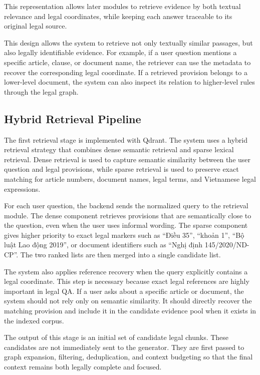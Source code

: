 This representation allows later modules to retrieve evidence by both textual relevance and legal coordinates, while keeping each answer traceable to its original legal source.

This design allows the system to retrieve not only textually similar passages, but also legally identifiable evidence. For example, if a user question mentions a specific article, clause, or document name, the retriever can use the metadata to recover the corresponding legal coordinate. If a retrieved provision belongs to a lower-level document, the system can also inspect its relation to higher-level rules through the legal graph.

\subsection{Hybrid Retrieval Pipeline}
The first retrieval stage is implemented with Qdrant. The system uses a hybrid retrieval strategy that combines dense semantic retrieval and sparse lexical retrieval. Dense retrieval is used to capture semantic similarity between the user question and legal provisions, while sparse retrieval is used to preserve exact matching for article numbers, document names, legal terms, and Vietnamese legal expressions.

For each user question, the backend sends the normalized query to the retrieval module. The dense component retrieves provisions that are semantically close to the question, even when the user uses informal wording. The sparse component gives higher priority to exact legal markers such as \enquote{Điều 35}, \enquote{khoản 1}, \enquote{Bộ luật Lao động 2019}, or document identifiers such as \enquote{Nghị định 145/2020/ND-CP}. The two ranked lists are then merged into a single candidate list.

The system also applies reference recovery when the query explicitly contains a legal coordinate. This step is necessary because exact legal references are highly important in legal QA. If a user asks about a specific article or document, the system should not rely only on semantic similarity. It should directly recover the matching provision and include it in the candidate evidence pool when it exists in the indexed corpus.

The output of this stage is an initial set of candidate legal chunks. These candidates are not immediately sent to the generator. They are first passed to graph expansion, filtering, deduplication, and context budgeting so that the final context remains both legally complete and focused.

